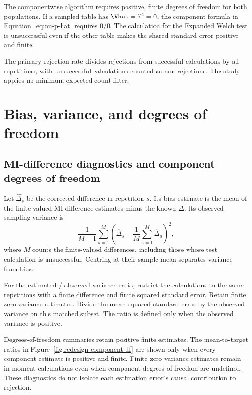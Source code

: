 The componentwise algorithm requires positive, finite degrees of freedom
for both populations. If a sampled table has
\(\Vhat=\widehat\tau^2=0\), the component formula in
Equation~\eqref{eq:nu-p-hat} requires \(0/0\). The calculation for the Expanded
Welch test is unsuccessful even if the other table makes the shared standard
error positive and finite.

The primary rejection rate divides rejections from successful calculations
by all repetitions, with unsuccessful calculations counted as non-rejections.
The study applies no minimum expected-count filter.

\section{Bias, variance, and degrees of freedom}
\label{sec:estimation-diagnostics}

\subsection{MI-difference diagnostics and component degrees of freedom}

Let \(\widehat\Delta_s\) be the corrected difference in repetition
\(s\). Its bias estimate is the mean of the finite-valued MI difference
estimates minus the known \(\Delta\). Its observed sampling variance is
\begin{equation}
 \frac{1}{M-1}\sum_{s=1}^M
 \left(\widehat\Delta_s-\frac{1}{M}\sum_{u=1}^M\widehat\Delta_u\right)^2,
 \label{eq:observed-sampling-variance}
\end{equation}
where \(M\) counts the finite-valued differences, including those whose
test calculation is unsuccessful. Centring at their sample mean separates
variance from bias.

For the estimated / observed variance ratio, restrict the calculations to
the same repetitions with a finite difference and finite squared
standard error. Retain finite zero variance estimates. Divide the mean
squared standard error by the observed variance on this matched subset.
The ratio is defined only when the observed variance is positive.

Degrees-of-freedom summaries retain positive finite estimates.
The mean-to-target ratios in Figure~\ref{fig:redesign-component-df}
are shown only when every component estimate is positive and finite.
Finite zero variance estimates remain in moment calculations even when
component degrees of freedom are undefined. These diagnostics do not isolate
each estimation error's causal contribution to rejection.

